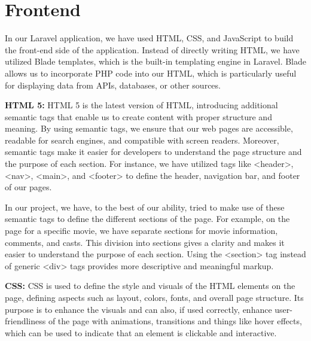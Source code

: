 \section{Frontend}

In our Laravel application, we have used HTML, CSS, and JavaScript to build the front-end side of the application.
Instead of directly writing HTML, we have utilized Blade templates, which is the built-in templating engine in Laravel.
Blade allows us to incorporate PHP code into our HTML, which is particularly useful for displaying data from APIs, databases, or other sources.\newline

\textbf{HTML 5:} \newline
HTML 5 is the latest version of HTML, introducing additional semantic tags that enable us to create content with proper structure and meaning.
By using semantic tags, we ensure that our web pages are accessible, readable for search engines, and compatible with screen readers.
Moreover, semantic tags make it easier for developers to understand the page structure and the purpose of each section.
For instance, we have utilized tags like \textless{}header\textgreater{}, \textless{}nav\textgreater{}, \textless{}main\textgreater{}, and \textless{}footer\textgreater{} to define the header, navigation bar, and footer of our pages.\newline

In our project, we have, to the best of our ability, tried to make use of these semantic tags to define the different sections of the page.
For example, on the page for a specific movie, we have separate sections for movie information, comments, and casts.
This division into sections gives a clarity and makes it easier to understand the purpose of each section.
Using the \textless{}section\textgreater{} tag instead of generic \textless{}div\textgreater{} tags provides more descriptive and meaningful markup.\newline

\textbf{CSS:} \newline
CSS is used to define the style and visuals of the HTML elements on the page, defining aspects such as layout, colors, fonts, and overall page structure.
Its purpose is to enhance the visuals and can also, if used correctly, enhance user-friendliness of the page with animations, transitions and things like hover effects, which can be used to indicate that an element is clickable and interactive.\newline

